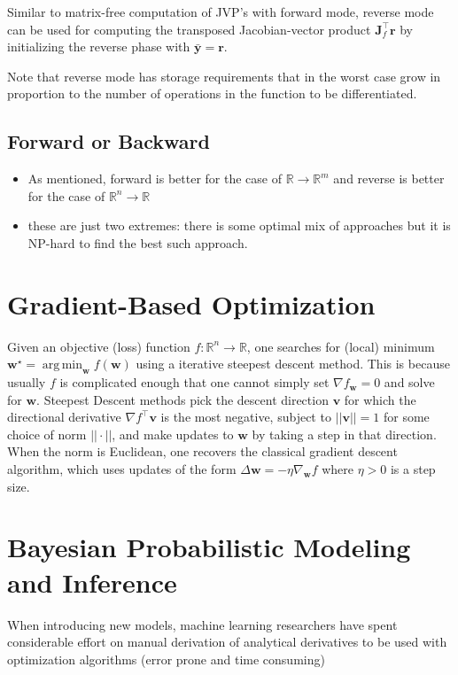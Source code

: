 \documentclass[11pt]{article}
\theoremstyle{definition}
\theoremstyle{plain}
\DeclareMathOperator*{\argmin}{arg\,min}
\renewcommand{\v}[1]{\mathbf{#1}}
\renewcommand{\b}[1]{\mathbb{#1}}
\begin{document}
\noindent Similar to matrix-free computation of JVP's with forward mode, reverse
mode can be used for computing the transposed Jacobian-vector product
$\v{J}_f^\top \v{r}$ by initializing the reverse phase with $\bar{\v{y}}=\v{r}$.

\noindent Note that reverse mode has storage requirements that in the worst case
grow in proportion to the number of operations in the function to be differentiated.

\subsection{Forward or Backward}

\begin{itemize}
    \item As mentioned, forward is better for the case of $\b{R} \rightarrow \b{R}^m$
    and reverse is better for the case of $\b{R}^n \rightarrow \b{R}$
    \item these are just two extremes: there is some optimal mix of approaches
          but it is NP-hard to find the best such approach.
\end{itemize}

\section{Gradient-Based Optimization}

\noindent Given an objective (loss) function $f: \b{R}^n \rightarrow \b{R}$,
one searches for (local) minimum $\v{w}^\star = \argmin_{\v{w}} f(\v{w})$ 
using a iterative steepest descent method. This is because usually
$f$ is complicated enough that one cannot simply set $\nabla f_{\v{w}} = 0$ and solve
for $\v{w}$. Steepest Descent methods pick the descent direction $\v{v}$ for which
the directional derivative $\nabla f^\top \v{v}$ is the most negative, subject
to $||\v{v}|| = 1$ for some choice of norm $||\cdot||$, and make updates to
$\v{w}$ by taking a step in that direction. When the norm is Euclidean, one
recovers the classical gradient descent algorithm, which uses
updates of the form $\Delta \v{w} = - \eta \nabla_{\v{w}} f$
where $\eta > 0$ is a step size. 

\section{Bayesian Probabilistic Modeling and Inference}

When introducing new models, machine learning researchers have spent considerable
effort on manual derivation of analytical derivatives to be used with
optimization algorithms (error prone and time consuming)
\end{document}
